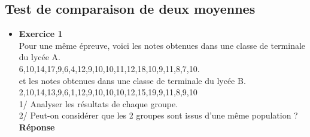\documentclass[a4paper,11pt]{book}
\begin{document}
\subsection{Test de comparaison de deux moyennes}
\begin{itemize}
\item {\bf Exercice 1}\\
Pour une m\^eme \'epreuve,
voici les notes obtenues dans une classe de terminale du lyc\'ee A.\\
6,10,14,17,9,6,4,12,9,10,10,11,12,18,10,9,11,8,7,10.\\
et les notes obtenues dans une classe de terminale du lyc\'ee B.\\
2,10,14,13,9,6,1,12,9,10,10,10,12,15,19,9,11,8,9,10\\
1/ Analyser les r\'esultats de chaque groupe.\\
2/ Peut-on consid\'erer que les 2 groupes sont issus d'une m\^eme population ?\\
{\bf R\'eponse}


\end{itemize}
\end{document}
